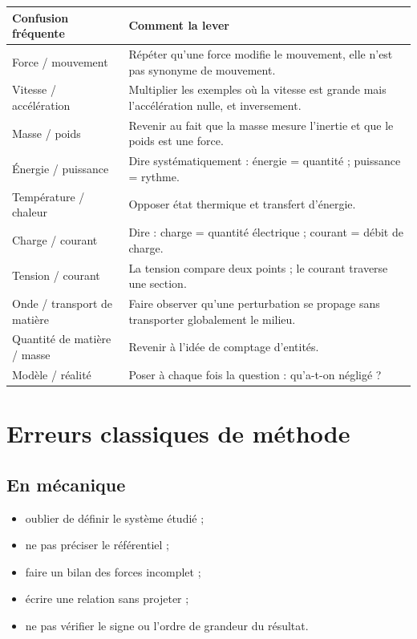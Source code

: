 \documentclass[11pt,a4paper]{article}
\begin{document}
\begin{longtable}{p{} p{}}
\toprule
\textbf{Confusion fréquente} & \textbf{Comment la lever} \\
\midrule
Force / mouvement & Répéter qu'une force modifie le mouvement, elle n'est pas synonyme de mouvement. \\
Vitesse / accélération & Multiplier les exemples où la vitesse est grande mais l'accélération nulle, et inversement. \\
Masse / poids & Revenir au fait que la masse mesure l'inertie et que le poids est une force. \\
Énergie / puissance & Dire systématiquement : énergie = quantité ; puissance = rythme. \\
Température / chaleur & Opposer état thermique et transfert d'énergie. \\
Charge / courant & Dire : charge = quantité électrique ; courant = débit de charge. \\
Tension / courant & La tension compare deux points ; le courant traverse une section. \\
Onde / transport de matière & Faire observer qu'une perturbation se propage sans transporter globalement le milieu. \\
Quantité de matière / masse & Revenir à l'idée de comptage d'entités. \\
Modèle / réalité & Poser à chaque fois la question : qu'a-t-on négligé ? \\
\bottomrule
\end{longtable}

\section{Erreurs classiques de méthode}

\subsection{En mécanique}
\begin{itemize}
    \item oublier de définir le système étudié ;
    \item ne pas préciser le référentiel ;
    \item faire un bilan des forces incomplet ;
    \item écrire une relation sans projeter ;
    \item ne pas vérifier le signe ou l'ordre de grandeur du résultat.
\end{itemize}
\end{document}

